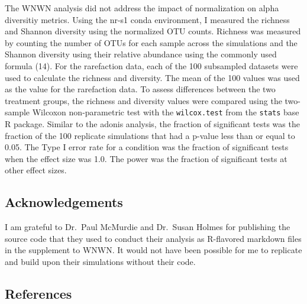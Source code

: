 \documentclass[
]{article}
\begin{document}
The WNWN analysis did not address the impact of normalization on alpha
diversitiy metrics. Using the nr-s1 conda environment, I measured the
richness and Shannon diversity using the normalized OTU counts. Richness
was measured by counting the number of OTUs for each sample across the
simulations and the Shannon diversity using their relative abundance
using the commonly used formula (14). For the rarefaction data, each of
the 100 subsampled datasets were used to calculate the richness and
diversity. The mean of the 100 values was used as the value for the
rarefaction data. To assess differences between the two treatment
groups, the richness and diversity values were compared using the
two-sample Wilcoxon non-parametric test with the \texttt{wilcox.test}
from the \texttt{stats} base R package. Similar to the adonis analysis,
the fraction of significant tests was the fraction of the 100 replicate
simulations that had a p-value less than or equal to 0.05. The Type I
error rate for a condition was the fraction of significant tests when
the effect size was 1.0. The power was the fraction of significant tests
at other effect sizes.

\hypertarget{acknowledgements}{%
\subsection{Acknowledgements}\label{acknowledgements}}

I am grateful to Dr.~Paul McMurdie and Dr.~Susan Holmes for publishing
the source code that they used to conduct their analysis as R-flavored
markdown files in the supplement to WNWN. It would not have been
possible for me to replicate and build upon their simulations without
their code.

\newpage

\hypertarget{references}{%
\subsection{References}\label{references}}

\setlength{\parindent}{-0.25in}
\setlength{\leftskip}{0.25in}

\noindent
\end{document}
